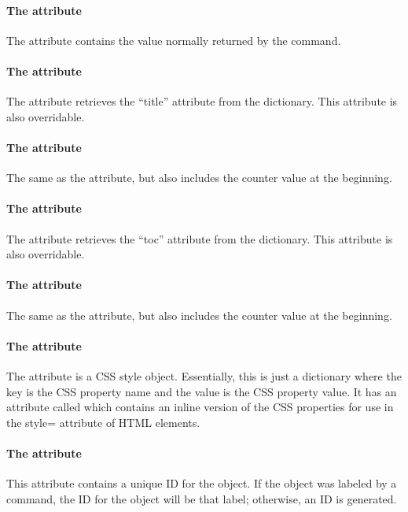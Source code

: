 \paragraph{The  attribute}
The  attribute contains the value normally returned
by the  command.

\paragraph{The  attribute}
The  attribute retrieves the ``title'' attribute from
the  dictionary.  This attribute is also overridable.

\paragraph{The  attribute}
The same as the  attribute, but also includes the 
counter value at the beginning.

\paragraph{The  attribute}
The  attribute retrieves the ``toc'' attribute from
the  dictionary.  This attribute is also overridable.

\paragraph{The  attribute}
The same as the  attribute, but also includes the 
counter value at the beginning.

\paragraph{The  attribute}
The  attribute is a CSS style object.  Essentially, this is
just a dictionary where the key is the CSS property name and the value 
is the CSS property value.  It has an attribute called 
which contains an inline version of the CSS properties for use
in the style= attribute of HTML elements.

\paragraph{The  attribute}
This attribute contains a unique ID for the object.  If the object
was labeled by a  command, the ID for the object will 
be that label; otherwise, an ID is generated.

